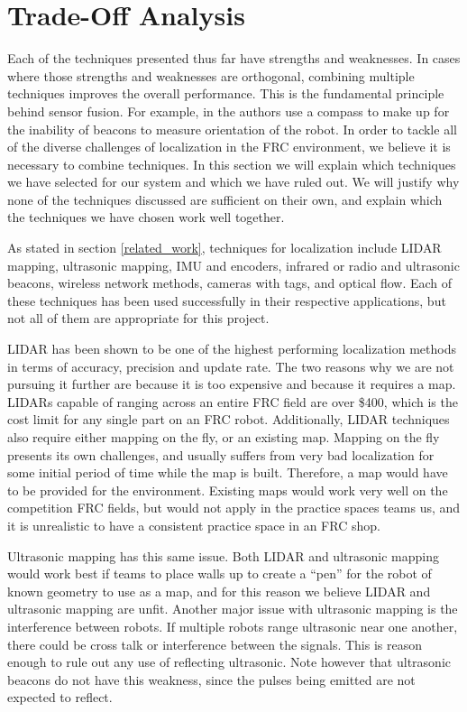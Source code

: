 \documentclass{article}
\begin{document}
\section{Trade-Off Analysis} \label{methods}

  Each of the techniques presented thus far have strengths and weaknesses. In cases where those strengths and weaknesses are orthogonal, combining multiple techniques improves the overall performance. This is the fundamental principle behind sensor fusion. For example, in \cite{kim_advanced_2008} the authors use a compass to make up for the inability of beacons to measure orientation of the robot. In order to tackle all of the diverse challenges of localization in the FRC environment, we believe it is necessary to combine techniques. In this section we will explain which techniques we have selected for our system and which we have ruled out. We will justify why none of the techniques discussed are sufficient on their own, and explain which the techniques we have chosen work well together.

  As stated in section \ref{related_work}, techniques for localization include LIDAR mapping, ultrasonic mapping, IMU and encoders, infrared or radio and ultrasonic beacons, wireless network methods, cameras with tags, and optical flow. Each of these techniques has been used successfully in their respective applications, but not all of them are appropriate for this project.

  LIDAR has been shown to be one of the highest performing localization methods in terms of accuracy, precision and update rate. The two reasons why we are not pursuing it further are because it is too expensive and because it requires a map. LIDARs capable of ranging across an entire FRC field are over \$400, which is the cost limit for any single part on an FRC robot. Additionally, LIDAR techniques also require either mapping on the fly, or an existing map. Mapping on the fly presents its own challenges, and usually suffers from very bad localization for some initial period of time while the map is built. Therefore, a map would have to be provided for the environment. Existing maps would work very well on the competition FRC fields, but would not apply in the practice spaces teams us, and it is unrealistic to have a consistent practice space in an FRC shop.

  Ultrasonic mapping has this same issue. Both LIDAR and ultrasonic mapping would work best if teams to place walls up to create a ``pen'' for the robot of known geometry to use as a map, and for this reason we believe LIDAR and ultrasonic mapping are unfit. Another major issue with ultrasonic mapping is the interference between robots. If multiple robots range ultrasonic near one another, there could be cross talk or interference between the signals. This is reason enough to rule out any use of reflecting ultrasonic. Note however that ultrasonic beacons do not have this weakness, since the pulses being emitted are not expected to reflect.
\end{document}
